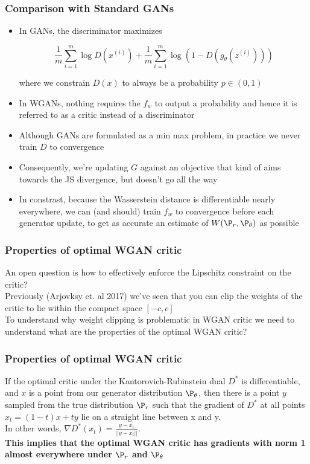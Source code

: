 \documentclass{beamer}
\begin{document}
\begin{frame}
\frametitle{Comparison with Standard GANs}
\begin{itemize}
\pause
\item{In GANs, the discriminator maximizes 

$$ \frac{1}{m} \sum_{i=1}^{m} \log D(x^{(i)}) + \frac{1}{m} \sum_{i=1}^{m} \log (1 - D(g_{\theta}(z^{(i)}))) $$ 

where we constrain $D(x)$ to always be a probability $p \in (0,1)$}
\pause
\item{In WGANs, nothing requires the $f_{w}$ to output a probability and hence it is referred to as a critic instead of a discriminator}
\pause
\item{Although GANs are formulated as a min max problem, in practice we never train $D$ to convergence}
\pause
\item{Consequently, we're updating $G$ against an objective that kind of aims towards the JS divergence, but doesn't go all the way}
\pause
\item{In constrast, because the Wasserstein distance is differentiable nearly everywhere, we can (and should) train $f_{w}$ to convergence before each generator update, to get as accurate an estimate of $W(\P_{r},\P_{\theta})$ as possible}
\end{itemize}
\end{frame}


\begin{frame}
\frametitle{Properties of optimal WGAN critic}
\pause
An open question is how to effectively enforce the Lipschitz constraint on the critic?\\
\vspace{0.12in}
\pause
Previously (Arjovksy et. al 2017) we've seen that you can clip the weights of the critic to lie within the compact space $[-c,c]$\\
\vspace{0.12in}
\pause
To understand why weight clipping is problematic in WGAN critic we need to understand what are the properties of the optimal WGAN critic?\\

\end{frame}

\begin{frame}
\frametitle{Properties of optimal WGAN critic}
\pause
If the optimal critic under the Kantorovich-Rubinstein dual $D^{*}$ is differentiable, and $x$ is a point from our generator distribution $\P_{\theta}$, then there is a point $y$ sampled from the true distribution $\P_{r}$ such that the gradient of $D^{*}$ at all points $x_{t} = (1-t)x + ty$ lie on a straight line between x and y.\\
\vspace{0.12in}
\pause
In other words, $\nabla D^{*}(x_t) = \frac{y - x_{t}}{||y-x_t||}$.\\
\vspace{0.12in}
\pause
\textbf{This implies that the optimal WGAN critic has gradients with norm 1 almost everywhere under $\P_{r}$ and $\P_{\theta}$}

\end{frame}
\end{document}
